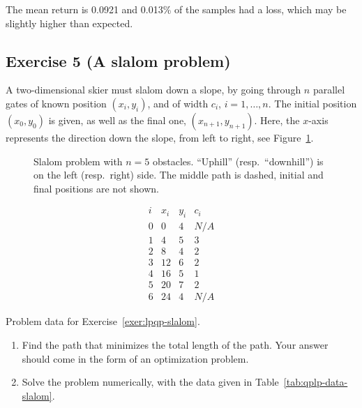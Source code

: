 \documentclass[11pt]{article}
\begin{document}
\begin{solution}
\begin{enumerate}
    The mean return is 0.0921 and 0.013\% of the samples had a loss, which may be slightly higher than expected.
\end{enumerate}
\end{solution}

\newpage
\subsection*{Exercise 5 (A slalom problem)}

A two-dimensional skier must slalom down a slope, by going through $n$ parallel gates of known position $(x_i,y_i)$, and of width $c_i$, $i=1,\ldots,n$. The initial position $(x_0,y_0)$ is given, as well as the final one, $(x_{n+1},y_{n+1})$. Here, the $x$-axis represents the direction down the slope, from left to right, see Figure~\ref{fig:slalom_pic.pdf}. \\


\begin{figure}[h]
\begin{center}
\end{center}
\caption{\label{fig:slalom_pic.pdf}  Slalom problem with $n=5$ obstacles. ``Uphill'' (resp.\ ``downhill'') is on the left (resp.\ right) side. The middle path is dashed, initial and final positions are not shown.}
\end{figure}

\begin{table}[h]
\begin{center}
\[
\begin{array}{c|ccc}
i & x_i & y_i & c_i \\\hline
0 & 0 & 4 & N/A \\
1 & 4 & 5 & 3 \\
2 & 8 & 4 & 2 \\
3 & 12 & 6 & 2 \\
4 & 16 & 5 & 1 \\
5 & 20 & 7 & 2 \\
6 & 24 & 4 & N/A
\end{array}
\]
\end{center}
\caption{Problem data for Exercise~\ref{exer:lpqp-slalom}.}
\label{tab:qplp-data-slalom}
\end{table}
\begin{enumerate}
\item Find the path that minimizes the total length of the path. Your answer should come in the form of an optimization problem.

\item Solve the problem numerically, with the data given in Table~\ref{tab:qplp-data-slalom}.
\end{enumerate}


\begin{solution}
\end{solution}
\end{document}
